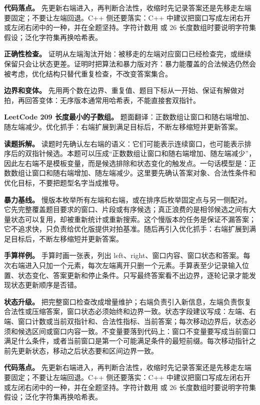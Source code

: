 \textbf{代码落点。} 先更新右端进入，再判断合法性，收缩时先记录答案还是先移走左端要固定；不要让左端回退。C++ 侧还要落实：C++ 中建议把窗口写成左闭右开或左闭右闭中的一种，并在全题坚持。字符计数用  或 26 长度数组时要说明字符集假设；泛化字符集再换哈希表。

\textbf{正确性检查。} 证明从左端淘汰开始：被移走的左端对应窗口已经检查完，或继续保留只会让状态更差。证明时把算法和暴力版对齐：暴力能覆盖的合法候选仍然会被考虑，优化结构只替代重复检查，不改变答案集合。

\textbf{边界和变体。} 先用两个数在边界、重复值、题目下标从一开始、保证有解做对拍，再回答变体：无序版本通常用哈希表，不能直接套双指针。

\noindent\textbf{LeetCode 209 长度最小的子数组。} 题面翻译：正数数组让窗口和随右端增加、随左端减少。优化抓手：右端扩展到满足目标后，不断左移缩短并更新答案。

\textbf{读题拆解。} 读题时先确认左右端的语义：它们可能表示连续窗口，也可能表示排序后的双指针候选。本题可以压成“正数数组让窗口和随右端增加、随左端减少”，因此左右端不是模板变量，而是候选排除和状态变化的触发点。一句话模型是：正数数组让窗口和随右端增加、随左端减少。这里要先确认答案对象、合法性条件和优化目标，不要把题型名字当成推导。

\textbf{暴力基线。} 慢版本枚举所有左端和右端，或在排序后枚举固定点与另一侧配对。它先完整覆盖题目要求的窗口、片段或有序候选；真正浪费的是相邻候选之间有大量状态可以复用，却被重新统计或重新搜索。这个慢版本的任务是保证不漏答案；它不追求快，只负责给优化版提供对拍基准。随后再引入优化抓手：右端扩展到满足目标后，不断左移缩短并更新答案。

\textbf{手算样例。} 手算时画一张表，列出 left、right、窗口内容、窗口状态和答案。每次右端进入只加一个元素，每次左端离开只删一个元素。手算表至少记录输入位置、状态变化、答案更新和停止条件。只写最终答案看不出边界，逐轮记录才能发现状态更新顺序是否错。

\textbf{状态升级。} 把完整窗口检查改成增量维护；右端负责引入新信息，左端负责恢复合法性或压缩答案，窗口状态必须始终和边界一致。状态字段建议写成：左端、右端、窗口计数或当前双指针和、合法性指标、当前答案；每次移动边界后，状态必须和候选区间或窗口内容一致。不变量要落到代码上：窗口不变量要写成当前窗口满足什么条件，或者当前窗口是第一个可能满足条件的最短前缀。每次移动指针之前先更新状态，移动之后状态要和区间边界一致。

\textbf{代码落点。} 先更新右端进入，再判断合法性，收缩时先记录答案还是先移走左端要固定；不要让左端回退。C++ 侧还要落实：C++ 中建议把窗口写成左闭右开或左闭右闭中的一种，并在全题坚持。字符计数用  或 26 长度数组时要说明字符集假设；泛化字符集再换哈希表。

